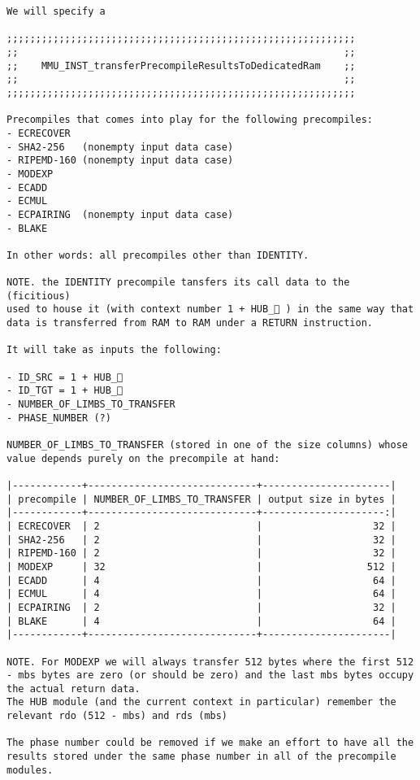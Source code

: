 \documentclass[varwidth=\maxdimen,margin=0.5cm,multi={verbatim}]{standalone}
\begin{document}
\begin{verbatim}
We will specify a

;;;;;;;;;;;;;;;;;;;;;;;;;;;;;;;;;;;;;;;;;;;;;;;;;;;;;;;;;;;;
;;                                                        ;;
;;    MMU_INST_transferPrecompileResultsToDedicatedRam    ;;
;;                                                        ;;
;;;;;;;;;;;;;;;;;;;;;;;;;;;;;;;;;;;;;;;;;;;;;;;;;;;;;;;;;;;;

Precompiles that comes into play for the following precompiles:
- ECRECOVER
- SHA2-256   (nonempty input data case)
- RIPEMD-160 (nonempty input data case)
- MODEXP
- ECADD
- ECMUL
- ECPAIRING  (nonempty input data case)
- BLAKE

In other words: all precompiles other than IDENTITY.

NOTE. the IDENTITY precompile tansfers its call data to the (ficitious)
used to house it (with context number 1 + HUB_ ) in the same way that
data is transferred from RAM to RAM under a RETURN instruction.

It will take as inputs the following:

- ID_SRC = 1 + HUB_
- ID_TGT = 1 + HUB_
- NUMBER_OF_LIMBS_TO_TRANSFER
- PHASE_NUMBER (?)

NUMBER_OF_LIMBS_TO_TRANSFER (stored in one of the size columns) whose value depends purely on the precompile at hand:

|------------+-----------------------------+----------------------|
| precompile | NUMBER_OF_LIMBS_TO_TRANSFER | output size in bytes |
|------------+-----------------------------+---------------------:|
| ECRECOVER  | 2                           |                   32 |
| SHA2-256   | 2                           |                   32 |
| RIPEMD-160 | 2                           |                   32 |
| MODEXP     | 32                          |                  512 |
| ECADD      | 4                           |                   64 |
| ECMUL      | 4                           |                   64 |
| ECPAIRING  | 2                           |                   32 |
| BLAKE      | 4                           |                   64 |
|------------+-----------------------------+----------------------|

NOTE. For MODEXP we will always transfer 512 bytes where the first 512 - mbs bytes are zero (or should be zero) and the last mbs bytes occupy the actual return data.
The HUB module (and the current context in particular) remember the relevant rdo (512 - mbs) and rds (mbs)

The phase number could be removed if we make an effort to have all the results stored under the same phase number in all of the precompile modules. 
\end{verbatim}
\end{document}
